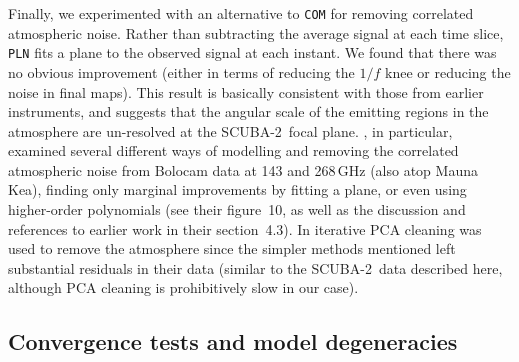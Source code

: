 \documentclass[useAMS,usenatbib,nofootinbib]{mn2e}
\newcommand{\scuba}{SCUBA-2}
\newcommand{\model}[1]{\texttt{#1}}
\begin{document}
Finally, we experimented with an alternative to \model{COM} for
removing correlated atmospheric noise. Rather than subtracting the
average signal at each time slice, \model{PLN} fits a plane to the
observed signal at each instant. We found that there was no obvious
improvement (either in terms of reducing the $1/f$ knee or reducing
the noise in final maps). This result is basically consistent with
those from earlier instruments, and suggests that the angular scale of
the emitting regions in the atmosphere are un-resolved at the \scuba\
focal plane. \citet{sayers2010}, in particular, examined several
different ways of modelling and removing the correlated atmospheric
noise from Bolocam data at 143 and 268\,GHz (also atop Mauna Kea),
finding only marginal improvements by fitting a plane, or even using
higher-order polynomials (see their figure~10, as well as the
discussion and references to earlier work in their section~4.3). In
\citet{aguirre2011} iterative PCA cleaning was used to remove the
atmosphere since the simpler methods mentioned left substantial
residuals in their data (similar to the \scuba\ data described here,
although PCA cleaning is prohibitively slow in our case).

\subsection{Convergence tests and model degeneracies}
\label{sec:converge}
\end{document}
